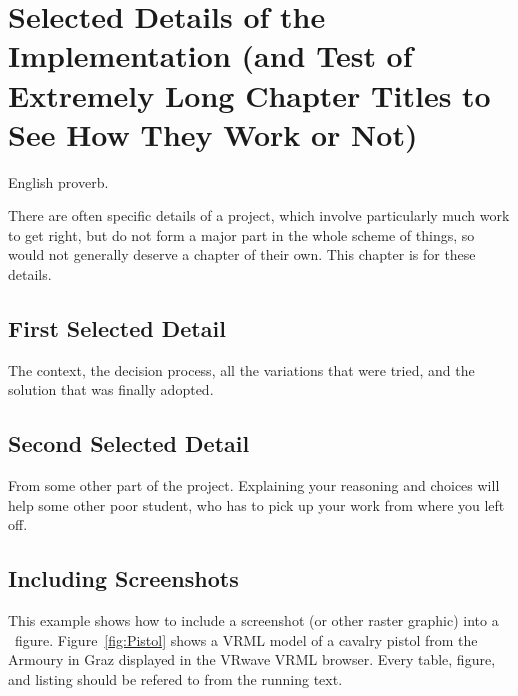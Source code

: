 %
%
% 
% 
% 

\chapter{Selected Details of the Implementation
(and Test of Extremely
Long Chapter Titles to See How They Work or Not)
}

\label{chap:SelectedDetails}


{
English proverb.
}


There are often specific details of a project, which involve
particularly much work to get right, but do not form a major part in
the whole scheme of things, so would not generally deserve a chapter
of their own. This chapter is for these details.




\section{First Selected Detail}

The context, the decision process, all the variations that were tried,
and the solution that was finally adopted.



\section{Second Selected Detail}

From some other part of the project. Explaining your reasoning and
choices will help some other poor student, who has to pick up your
work from where you left off.






\section{Including Screenshots}

This example shows how to include a screenshot (or other raster
graphic) into a \LaTeXe\ figure. Figure~\ref{fig:Pistol} shows a VRML
model of a cavalry pistol from the Armoury in Graz displayed in the
VRwave VRML browser. Every table, figure, and listing should be
refered to from the running text.

